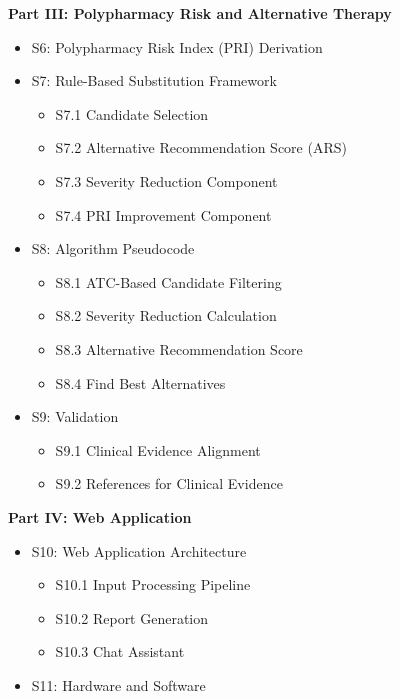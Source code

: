 \documentclass[12pt,a4paper]{article}
\begin{document}
\noindent\textbf{Part III: Polypharmacy Risk and Alternative Therapy}
\begin{itemize}
    \setlength{\itemsep}{0pt}
    \item[] S6: Polypharmacy Risk Index (PRI) Derivation \dotfill \pageref{sec:s6}
    \item[] S7: Rule-Based Substitution Framework \dotfill \pageref{sec:s7}
    \begin{itemize}
        \setlength{\itemsep}{0pt}
        \item[] S7.1 Candidate Selection
        \item[] S7.2 Alternative Recommendation Score (ARS)
        \item[] S7.3 Severity Reduction Component
        \item[] S7.4 PRI Improvement Component
    \end{itemize}
    \item[] S8: Algorithm Pseudocode \dotfill \pageref{sec:s8}
    \begin{itemize}
        \setlength{\itemsep}{0pt}
        \item[] S8.1 ATC-Based Candidate Filtering
        \item[] S8.2 Severity Reduction Calculation
        \item[] S8.3 Alternative Recommendation Score
        \item[] S8.4 Find Best Alternatives
    \end{itemize}
    \item[] S9: Validation \dotfill \pageref{sec:s9}
    \begin{itemize}
        \setlength{\itemsep}{0pt}
        \item[] S9.1 Clinical Evidence Alignment
        \item[] S9.2 References for Clinical Evidence
    \end{itemize}
\end{itemize}

\noindent\textbf{Part IV: Web Application}
\begin{itemize}
    \setlength{\itemsep}{0pt}
    \item[] S10: Web Application Architecture \dotfill \pageref{sec:s10}
    \begin{itemize}
        \setlength{\itemsep}{0pt}
        \item[] S10.1 Input Processing Pipeline
        \item[] S10.2 Report Generation
        \item[] S10.3 Chat Assistant
    \end{itemize}
    \item[] S11: Hardware and Software \dotfill \pageref{sec:s11}
\end{itemize}
\end{document}
